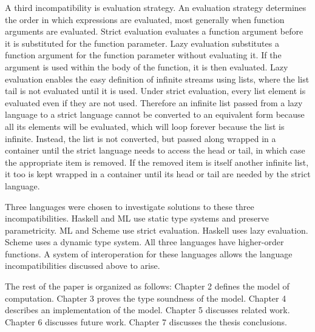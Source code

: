A third incompatibility is evaluation strategy.  An evaluation strategy determines the order in which expressions are evaluated, most generally when function arguments are evaluated.  Strict evaluation evaluates a function argument before it is substituted for the function parameter.  Lazy evaluation substitutes a function argument for the function parameter without evaluating it.  If the argument is used within the body of the function, it is then evaluated.  Lazy evaluation enables the easy definition of infinite streams using lists, where the list tail is not evaluated until it is used.  Under strict evaluation, every list element is evaluated even if they are not used.  Therefore an infinite list passed from a lazy language to a strict language cannot be converted to an equivalent form because all its elements will be evaluated, which will loop forever because the list is infinite.  Instead, the list is not converted, but passed along wrapped in a container until the strict language needs to access the head or tail, in which case the appropriate item is removed.  If the removed item is itself another infinite list, it too is kept wrapped in a container until its head or tail are needed by the strict language.

Three languages were chosen to investigate solutions to these three incompatibilities.  Haskell and ML use static type systems and preserve parametricity.  ML and Scheme use strict evaluation.  Haskell uses lazy evaluation.  Scheme uses a dynamic type system.  All three languages have higher-order functions.  A system of interoperation for these languages allows the language incompatibilities discussed above to arise.  

The rest of the paper is organized as follows: Chapter 2 defines the model of computation.  Chapter 3 proves the type soundness of the model.  Chapter 4 describes an implementation of the model.  Chapter 5 discusses related work.  Chapter 6 discusses future work.  Chapter 7 discusses the thesis conclusions.